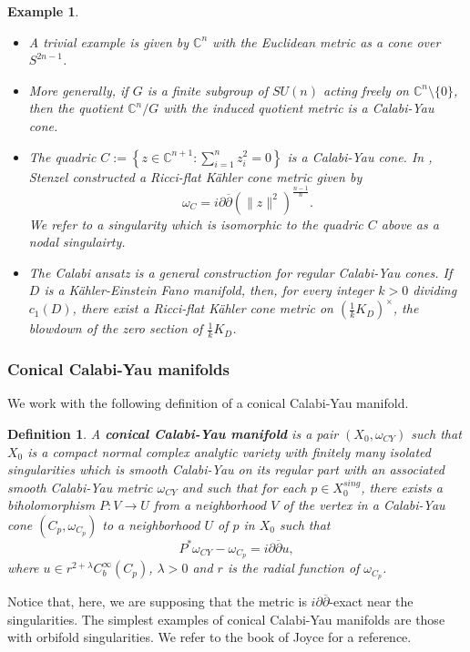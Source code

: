 \documentclass[a4paper,11pt]{article}
\newcounter{mythm}[section]
\newtheorem{defi}[mythm]{Definition}
\newtheorem{ex}[mythm]{Example}
\def\C{\mathbb{C}}
\begin{document}
\begin{ex}
\hfill
    \begin{itemize}
        \item A trivial example is given by $\C^n$ with the Euclidean metric as a cone over $S^{2n-1}$.
        \item More generally, if $G$ is a finite subgroup of $SU(n)$ acting freely on $\C^n \setminus \{ 0 \}$, then the quotient $\C^n / G$ with the induced quotient metric is a Calabi-Yau cone. 
        \item The quadric $C := \left\{ z\in \C^{n+1}  : \sum_{i=1}^n z_i^2 = 0\right\}$ is a Calabi-Yau cone. In \cite{stenzel_ricci-flat_1993}, Stenzel constructed a Ricci-flat Kähler cone metric given by
        $$\omega_{C} = i \partial \overline{\partial} \left( \| z\|^2 \right)^{\frac{n-1}{n}}.$$
        We refer to a singularity which is isomorphic to the quadric $C$ above as a \emph{nodal singulairty}.
        \item The Calabi ansatz \cite{calabi_metriques_1979} is a general construction for regular Calabi-Yau cones. If $D$ is a Kähler-Einstein Fano manifold, then, for every integer $k>0$ dividing $c_1(D)$, there exist a Ricci-flat Kähler cone metric on $(\frac{1}{k} K_D)^{\times}$, the blowdown of the zero section of $\frac{1}{k} K_D$.
    \end{itemize}
\end{ex}

\subsubsection*{Conical Calabi-Yau manifolds}
We work with the following definition of a conical Calabi-Yau manifold.
\begin{defi} \label{def : conical CY}
    A \textbf{conical Calabi-Yau manifold} is a pair $(X_0, \omega_{CY})$ such that $X_0$ is a compact normal complex analytic variety with finitely many isolated singularities which is smooth Calabi-Yau on its regular part with an associated smooth Calabi-Yau metric $\omega_{CY}$ and such that for each $p \in X_0^{sing}$, there exists a biholomorphism $P : V \rightarrow U$ from a neighborhood $V$ of the vertex in a Calabi-Yau cone $(C_p, \omega_{C_p})$ to a neighborhood $U$ of $p$ in $X_0$ such that 
    $$
    P^* \omega_{CY} - \omega_{C_p} = i \partial \overline{\partial}u,
    $$
    where $u \in r^{2+\lambda} C_b^{\infty} (C_p)$, $\lambda >0$ and $r$ is the radial function of $\omega_{C_p}$.
\end{defi}
Notice that, here, we are supposing that the metric is $i \partial \overline{\partial}$-exact near the singularities. The simplest examples of conical Calabi-Yau manifolds are those with orbifold singularities. We refer to the book of Joyce \cite{joyce2000compact} for a reference. 
\end{document}
